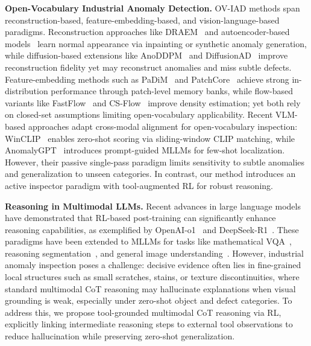 \documentclass{llmxive}
\begin{document}
\textbf{Open-Vocabulary Industrial Anomaly Detection.}
OV-IAD methods span reconstruction-based, feature-embedding-based, and vision-language-based paradigms. Reconstruction approaches like DRAEM~\citep{zavrtanik2021draem} and autoencoder-based models~\citep{bergmann2018improving} learn normal appearance via inpainting or synthetic anomaly generation, while diffusion-based extensions like AnoDDPM~\citep{wyatt2022anoddpm} and DiffusionAD~\citep{mu2023diffusionad} improve reconstruction fidelity yet may reconstruct anomalies and miss subtle defects. Feature-embedding methods such as PaDiM~\citep{defard2021padim} and PatchCore~\citep{roth2022patchcore} achieve strong in-distribution performance through patch-level memory banks, while flow-based variants like FastFlow~\citep{yu2021fastflow} and CS-Flow~\citep{rudolph2022csflow} improve density estimation; yet both rely on closed-set assumptions limiting open-vocabulary applicability. Recent VLM-based approaches adapt cross-modal alignment for open-vocabulary inspection: WinCLIP~\citep{jeong2023winclip} enables zero-shot scoring via sliding-window CLIP matching, while AnomalyGPT~\citep{gu2024anomalygpt} introduces prompt-guided MLLMs for few-shot localization. However, their passive single-pass paradigm limits sensitivity to subtle anomalies and generalization to unseen categories. In contrast, our method introduces an active inspector paradigm with tool-augmented RL for robust reasoning.

\textbf{Reasoning in Multimodal LLMs.}
Recent advances in large language models have demonstrated that RL-based post-training can significantly enhance reasoning capabilities, as exemplified by OpenAI-o1~\citep{jaech2024openaio1} and DeepSeek-R1~\citep{deepseekr1}. These paradigms have been extended to MLLMs for tasks like mathematical VQA~\citep{peng2025lmmr1}, reasoning segmentation~\citep{liu2025seg}, and general image understanding~\citep{feng2025videor1}. However, industrial anomaly inspection poses a challenge: decisive evidence often lies in fine-grained local structures such as small scratches, stains, or texture discontinuities, where standard multimodal CoT reasoning may hallucinate explanations when visual grounding is weak, especially under zero-shot object and defect categories. To address this, we propose tool-grounded multimodal CoT reasoning via RL, explicitly linking intermediate reasoning steps to external tool observations to reduce hallucination while preserving zero-shot generalization.
\end{document}
